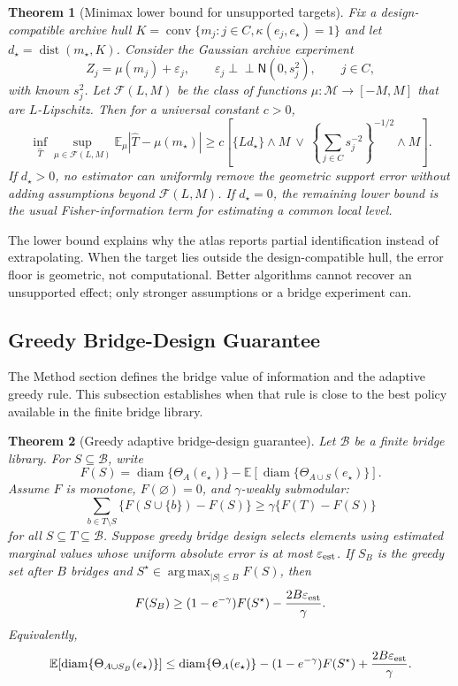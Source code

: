 \documentclass[11pt]{article}
\numberwithin{equation}{section}
\newtheorem{theorem}{Theorem}[section]
\DeclareMathOperator{\diam}{diam}
\DeclareMathOperator{\dist}{dist}
\DeclareMathOperator{\conv}{conv}
\DeclareMathOperator*{\argmax}{arg\,max}
\newcommand{\E}{\mathbb E}
\newcommand{\1}{\mathbf 1}
\newcommand{\cB}{\mathcal B}
\newcommand{\cF}{\mathcal F}
\newcommand{\cM}{\mathcal M}
\newcommand{\abs}[1]{\left\lvert #1\right\rvert}
\newcommand{\eps}{\varepsilon}
\newcommand{\ind}{\perp\!\!\!\perp}
\newcommand{\Normal}{\mathsf N}
\begin{document}
\begin{theorem}[Minimax lower bound for unsupported targets]
\label{thm:minimax}
Fix a design-compatible archive hull \(K=\conv\{m_j:j\in C,\kappa(e_j,e_\star)=1\}\) and let \(d_\star=\dist(m_\star,K)\).  Consider the Gaussian archive experiment
\[
  Z_j=\mu(m_j)+\varepsilon_j,
  \qquad
  \varepsilon_j\ind \Normal(0,s_j^2),
  \qquad j\in C,
\]
with known \(s_j^2\).  Let \(\cF(L,M)\) be the class of functions \(\mu:\cM\to[-M,M]\) that are \(L\)-Lipschitz.  Then for a universal constant \(c>0\),
\begin{equation}
\label{eq:minimax-bound}
  \inf_{\widehat T}
  \sup_{\mu\in\cF(L,M)}
  \E_\mu\abs{\widehat T-\mu(m_\star)}
  \ge
  c\left[
    \{Ld_\star\}\wedge M
    \ \vee\
    \left\{\sum_{j\in C}s_j^{-2}\right\}^{-1/2}\wedge M
  \right].
\end{equation}
If \(d_\star>0\), no estimator can uniformly remove the geometric support error without adding assumptions beyond \(\cF(L,M)\).  If \(d_\star=0\), the remaining lower bound is the usual Fisher-information term for estimating a common local level.
\end{theorem}

The lower bound explains why the atlas reports partial identification instead of extrapolating.  When the target lies outside the design-compatible hull, the error floor is geometric, not computational.  Better algorithms cannot recover an unsupported effect; only stronger assumptions or a bridge experiment can.

\subsection{Greedy Bridge-Design Guarantee}

The Method section defines the bridge value of information and the adaptive greedy rule.  This subsection establishes when that rule is close to the best policy available in the finite bridge library.

\begin{theorem}[Greedy adaptive bridge-design guarantee]
\label{thm:bridge}
Let \(\cB\) be a finite bridge library.  For \(S\subseteq\cB\), write
\[
  F(S)=\diam\{\Theta_A(e_\star)\}-\E[\diam\{\Theta_{A\cup S}(e_\star)\}].
\]
Assume \(F\) is monotone, \(F(\varnothing)=0\), and \(\gamma\)-weakly submodular:
\[
  \sum_{b\in T\setminus S}\{F(S\cup\{b\})-F(S)\}
  \ge
  \gamma\{F(T)-F(S)\}
\]
for all \(S\subseteq T\subseteq\cB\).  Suppose greedy bridge design selects elements using estimated marginal values whose uniform absolute error is at most \(\eps_{\rm est}\).  If \(S_B\) is the greedy set after \(B\) bridges and \(S^\star\in\argmax_{|S|\le B}F(S)\), then
\begin{equation}
\label{eq:bridge-bound}
  F(S_B)
  \ge
  (1-e^{-\gamma})F(S^\star)-\frac{2B\eps_{\rm est}}{\gamma}.
\end{equation}
Equivalently,
\[
  \E[\diam\{\Theta_{A\cup S_B}(e_\star)\}]
  \le
  \diam\{\Theta_A(e_\star)\}
  -(1-e^{-\gamma})F(S^\star)
  +\frac{2B\eps_{\rm est}}{\gamma}.
\]
\end{theorem}
\end{document}
